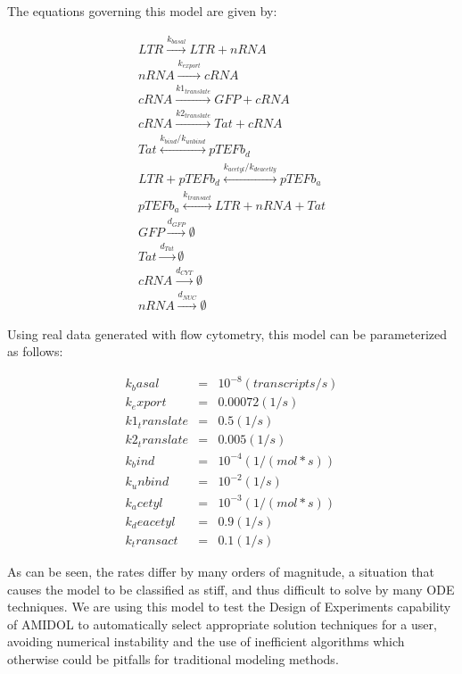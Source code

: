 \documentclass[11pt]{article}
\newcommand{\amidol}{\textsc{AMIDOL}}
\begin{document}
The equations governing this model are given by:

\begin{eqnarray}
LTR \overset{k_{basal}}{\rightarrow} LTR + nRNA\\
nRNA \overset{k_{export}}{\rightarrow} cRNA\\
  cRNA \overset{k1_{translate}}{\rightarrow} GFP + cRNA\\
  cRNA \overset{k2_{translate}}{\rightarrow} Tat + cRNA\\
  Tat \overset{k_{bind}/k_{unbind}}{\leftrightarrow} pTEFb_d\\
  LTR + pTEFb_d \overset{k_{acetyl}/k_{deacetly}}{\leftrightarrow} pTEFb_a\\
  pTEFb_a \overset{k_{transact}}{\leftrightarrow} LTR + nRNA + Tat\\
  GFP \overset{d_{GFP}}{\rightarrow} \emptyset\\
  Tat \overset{d_{Tat}}{\rightarrow} \emptyset\\
  cRNA \overset{d_{CYT}}{\rightarrow} \emptyset\\
  nRNA \overset{d_{NUC}}{\rightarrow} \emptyset
\end{eqnarray}

Using real data generated with flow cytometry, this model can be parameterized as follows:

\begin{eqnarray}
k_basal &=& 10^{-8} (transcripts/s)\\
  k_export &=& 0.00072 (1/s)\\
  k1_translate &=& 0.5 (1/s)\\
  k2_translate &=& 0.005 (1/s)\\
  k_bind &=& 10^{-4} (1/(mol * s))\\
  k_unbind &=& 10^{-2} (1/s)\\
  k_acetyl &=& 10^{-3} (1/(mol * s))\\
  k_deacetyl &=& 0.9 (1/s)\\
  k_transact &=& 0.1 (1/s)
\end{eqnarray}

As can be seen, the rates differ by many orders of magnitude, a situation that causes the model to be classified as stiff, and thus difficult to solve by many ODE techniques.  We are using this model to test the Design of Experiments capability of \amidol{} to automatically select appropriate solution techniques for a user, avoiding numerical instability and the use of inefficient algorithms which otherwise could be pitfalls for traditional modeling methods.
\end{document}
